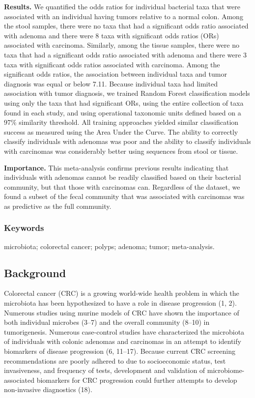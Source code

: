 \documentclass[12pt,]{article}
\begin{document}
\textbf{Results.} We quantified the odds ratios for individual bacterial
taxa that were associated with an individual having tumors relative to a
normal colon. Among the stool samples, there were no taxa that had a
significant odds ratio associated with adenoma and there were 8 taxa
with significant odds ratios (ORs) associated with carcinoma. Similarly,
among the tissue samples, there were no taxa that had a significant odds
ratio associated with adenoma and there were 3 taxa with significant
odds ratios associated with carcinoma. Among the significant odds
ratios, the association between individual taxa and tumor diagnosis was
equal or below 7.11. Because individual taxa had limited association
with tumor diagnosis, we trained Random Forest classification models
using only the taxa that had significant ORs, using the entire
collection of taxa found in each study, and using operational taxonomic
units defined based on a 97\% similarity threshold. All training
approaches yielded similar classification success as measured using the
Area Under the Curve. The ability to correctly classify individuals with
adenomas was poor and the ability to classify individuals with
carcinomas was considerably better using sequences from stool or tissue.

\newpage

\textbf{Importance.} This meta-analysis confirms previous results
indicating that individuals with adenomas cannot be readily classified
based on their bacterial community, but that those with carcinomas can.
Regardless of the dataset, we found a subset of the fecal community that
was associated with carcinomas was as predictive as the full community.

\subsubsection{Keywords}\label{keywords}

microbiota; colorectal cancer; polyps; adenoma; tumor; meta-analysis.

\newpage

\subsection{Background}\label{background}

Colorectal cancer (CRC) is a growing world-wide health problem in which
the microbiota has been hypothesized to have a role in disease
progression (1, 2). Numerous studies using murine models of CRC have
shown the importance of both individual microbes (3--7) and the overall
community (8--10) in tumorigenesis. Numerous case-control studies have
characterized the microbiota of individuals with colonic adenomas and
carcinomas in an attempt to identify biomarkers of disease progression
(6, 11--17). Because current CRC screening recommendations are poorly
adhered to due to socioeconomic status, test invasiveness, and frequency
of tests, development and validation of microbiome-associated biomarkers
for CRC progression could further attempts to develop non-invasive
diagnostics (18).
\end{document}
